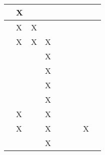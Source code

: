 \begin{longtable}{|l|llllllll|}
    \cite[]{Ningombam.2022}       & \multicolumn{1}{l|}{X}   & \multicolumn{1}{l|}{}     & \multicolumn{1}{l|}{}   & \multicolumn{1}{l|}{}   & \multicolumn{1}{l|}{}   & \multicolumn{1}{l|}{}   & \multicolumn{1}{l|}{}     &    \\ \hline
    \cite[]{Wong.2022}            & \multicolumn{1}{l|}{X}   & \multicolumn{1}{l|}{X}    & \multicolumn{1}{l|}{}   & \multicolumn{1}{l|}{}   & \multicolumn{1}{l|}{}   & \multicolumn{1}{l|}{}   & \multicolumn{1}{l|}{}     &    \\ \hline
    \cite[]{Schuderer.2021}       & \multicolumn{1}{l|}{X}   & \multicolumn{1}{l|}{X}    & \multicolumn{1}{l|}{X}   & \multicolumn{1}{l|}{}   & \multicolumn{1}{l|}{}   & \multicolumn{1}{l|}{}   & \multicolumn{1}{l|}{}     &    \\ \hline
    \cite[]{Korber.2021}          & \multicolumn{1}{l|}{}   & \multicolumn{1}{l|}{}    & \multicolumn{1}{l|}{X}   & \multicolumn{1}{l|}{}   & \multicolumn{1}{l|}{}   & \multicolumn{1}{l|}{}   & \multicolumn{1}{l|}{}     &    \\ \hline
    \cite[]{Bharadhwaj.2019}      & \multicolumn{1}{l|}{}   & \multicolumn{1}{l|}{}    & \multicolumn{1}{l|}{X}   & \multicolumn{1}{l|}{}   & \multicolumn{1}{l|}{}   & \multicolumn{1}{l|}{}   & \multicolumn{1}{l|}{}     &    \\ \hline
    \cite[]{Foronda.2021}         & \multicolumn{1}{l|}{}   & \multicolumn{1}{l|}{}    & \multicolumn{1}{l|}{X}   & \multicolumn{1}{l|}{}   & \multicolumn{1}{l|}{}   & \multicolumn{1}{l|}{}   & \multicolumn{1}{l|}{}     &    \\ \hline
    \cite[]{Maria.1997}           & \multicolumn{1}{l|}{}   & \multicolumn{1}{l|}{}    & \multicolumn{1}{l|}{X}   & \multicolumn{1}{l|}{}   & \multicolumn{1}{l|}{}   & \multicolumn{1}{l|}{}   & \multicolumn{1}{l|}{}     &    \\ \hline
    \cite[]{Brockman.2016}        & \multicolumn{1}{l|}{X}   & \multicolumn{1}{l|}{}    & \multicolumn{1}{l|}{X}   & \multicolumn{1}{l|}{}   & \multicolumn{1}{l|}{}   & \multicolumn{1}{l|}{}   & \multicolumn{1}{l|}{}     &    \\ \hline
    \cite[]{YanDuan.2016}         & \multicolumn{1}{l|}{X}   & \multicolumn{1}{l|}{}    & \multicolumn{1}{l|}{X}   & \multicolumn{1}{l|}{}   & \multicolumn{1}{l|}{}   & \multicolumn{1}{l|}{}   & \multicolumn{1}{l|}{X}     &    \\ \hline
    \cite[]{Ivaldi.2272014}       & \multicolumn{1}{l|}{}   & \multicolumn{1}{l|}{}    & \multicolumn{1}{l|}{X}   & \multicolumn{1}{l|}{}   & \multicolumn{1}{l|}{}   & \multicolumn{1}{l|}{}   & \multicolumn{1}{l|}{}     &    \\ \hline

\end{longtable}
